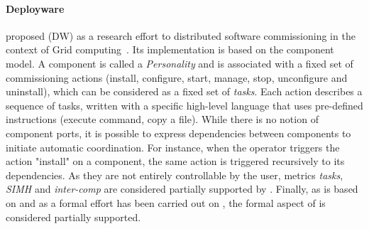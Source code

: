 \paragraph{Deployware}
\citeauthor{flissi2008ccgrid} proposed \deployware (DW) as a research
effort to distributed software commissioning in the context of Grid
computing~\cite{flissi2008ccgrid}. Its implementation is based on the
\fractal component model. A component is called a \emph{Personality}
and is associated with a fixed set of commissioning actions (install,
configure, start, manage, stop, unconfigure and uninstall),
which can be considered as a fixed set of \emph{tasks}.  Each action
describes a sequence of tasks, written with a specific high-level
language that uses pre-defined instructions (\eg execute command, copy
a file). While there is no notion of component ports, it is possible
to express dependencies between components to initiate automatic
coordination. For instance, when the operator triggers the action
"install" on a component, the same action is triggered recursively to
its dependencies. As they are not entirely controllable by the user,
metrics \emph{tasks}, \emph{SIMH} and \emph{inter-comp} are considered
partially supported by \deployware. Finally, as \deployware is
based on \fractal and as a formal effort has been carried out on \fractal,
the formal aspect of \deployware is considered partially supported.

